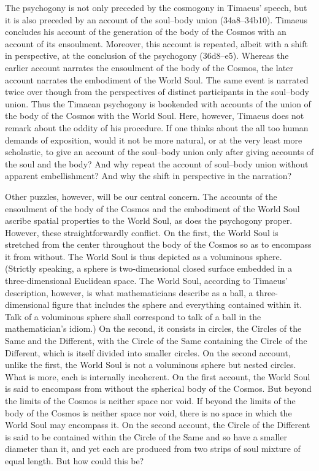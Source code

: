 The psychogony is not only preceded by the cosmogony in Timaeus' speech, but it is also preceded by an account of the soul--body union (34a8–34b10). Timaeus concludes his account of the generation of the body of the Cosmos with an account of its ensoulment. Moreover, this account is repeated, albeit with a shift in perspective, at the conclusion of the psychogony (36d8--e5). Whereas the earlier account narrates the ensoulment of the body of the Cosmos, the later account narrates the embodiment of the World Soul. The same event is narrated twice over though from the perspectives of distinct participants in the soul--body union. Thus the Timaean psychogony is bookended with accounts of the union of the body of the Cosmos with the World Soul. Here, however, Timaeus does not remark about the oddity of his procedure. If one thinks about the all too human demands of exposition, would it not be more natural, or at the very least more scholastic, to give an account of the soul--body union only after giving accounts of the soul and the body? And why repeat the account of soul--body union without apparent embellishment? And why the shift in perspective in the narration?

Other puzzles, however, will be our central concern. The accounts of the ensoulment of the body of the Cosmos and the embodiment of the World Soul ascribe spatial properties to the World Soul, as does the psychogony proper. However, these straightforwardly conflict. On the first, the World Soul is stretched from the center throughout the body of the Cosmos so as to encompass it from without. The World Soul is thus depicted as a voluminous sphere. (Strictly speaking, a sphere is two-dimensional closed surface embedded in a three-dimensional Euclidean space. The World Soul, according to Timaeus' description, however, is what mathematicians describe as a ball, a three-dimensional figure that includes the sphere and everything contained within it. Talk of a voluminous sphere shall correspond to talk of a ball in the mathematician's idiom.) On the second, it consists in circles, the Circles of the Same and the Different, with the Circle of the Same containing the Circle of the Different, which is itself divided into smaller circles. On the second account, unlike the first, the World Soul is not a voluminous sphere but nested circles. What is more, each is internally incoherent. On the first account, the World Soul is said to encompass from without the spherical body of the Cosmos. But beyond the limits of the Cosmos is neither space nor void. If beyond the limits of the body of the Cosmos is neither space nor void, there is no space in which the World Soul may encompass it. On the second account, the Circle of the Different is said to be contained within the Circle of the Same and so have a smaller diameter than it, and yet each are produced from two strips of soul mixture of equal length. But how could this be?


